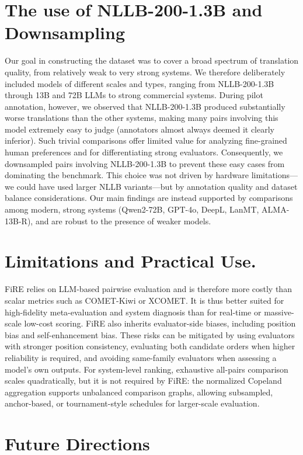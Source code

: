 \documentclass{article}
\theoremstyle{plain}
\theoremstyle{definition}
\theoremstyle{remark}
\begin{document}
\section{The use of NLLB-200-1.3B and Downsampling}\label{appx:nllb and downsampling}
Our goal in constructing the dataset was to cover a broad spectrum of translation quality, from relatively weak to very strong systems. We therefore deliberately included models of different scales and types, ranging from NLLB-200-1.3B through 13B and 72B LLMs to strong commercial systems. During pilot annotation, however, we observed that NLLB-200-1.3B produced substantially worse translations than the other systems, making many pairs involving this model extremely easy to judge (annotators almost always deemed it clearly inferior). Such trivial comparisons offer limited value for analyzing fine-grained human preferences and for differentiating strong evaluators. Consequently, we downsampled pairs involving NLLB-200-1.3B to prevent these easy cases from dominating the benchmark. This choice was not driven by hardware limitations—we could have used larger NLLB variants—but by annotation quality and dataset balance considerations. Our main findings are instead supported by comparisons among modern, strong systems (Qwen2-72B, GPT-4o, DeepL, LanMT, ALMA-13B-R), and are robust to the presence of weaker models.

\section{Limitations and Practical Use.}\label{appx:limitations}
FiRE relies on LLM-based pairwise evaluation and is therefore more costly than scalar metrics such as COMET-Kiwi or XCOMET. It is thus better suited for high-fidelity meta-evaluation and system diagnosis than for real-time or massive-scale low-cost scoring. FiRE also inherits evaluator-side biases, including position bias and self-enhancement bias. These risks can be mitigated by using evaluators with stronger position consistency, evaluating both candidate orders when higher reliability is required, and avoiding same-family evaluators when assessing a model's own outputs. For system-level ranking, exhaustive all-pairs comparison scales quadratically, but it is not required by FiRE: the normalized Copeland aggregation supports unbalanced comparison graphs, allowing subsampled, anchor-based, or tournament-style schedules for larger-scale evaluation.

\section{Future Directions}
\end{document}
